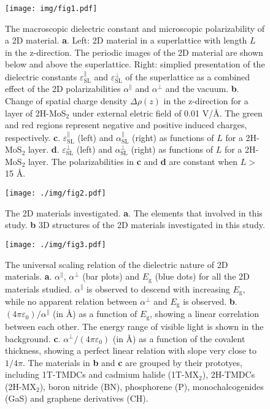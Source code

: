 \documentclass[journal=ancac3,manuscript=article,email=true,hyperref=true,keywords=false]{achemso}
\begin{document}
\label{sec:org34cbe74}
\begin{figure}[htbp]
\centering
\texttt{[image: img/fig1.pdf]}
\caption{\label{fig-1} The macroscopic dielectric constant and
  microscopic polarizability of a 2D material. \textbf{a}. Left: 2D
  material in a superlattice with length $L$ in the z-direction. The
  periodic images of the 2D material are shown below and above the
  superlattice. Right: simplied presentation of the dielectric
  constants $\varepsilon_{\mathrm{SL}}^{\parallel}$ and
  $\varepsilon_{\mathrm{SL}}^{\perp}$ of the superlattice as a
  combined effect of the 2D polarizabilities $\alpha^{\parallel}$ and
  $\alpha^{\perp}$ and the vacuum. \textbf{b}. Change of spatial
  charge density $\Delta \rho(z)$ in the z-direction for a layer of
  2H-MoS$_{2}$ under external eletric field of 0.01 V/\AA{}. The green
  and red regions represent negative and positive induced charges,
  respectively. \textbf{c}. $\varepsilon^{\parallel}_{\mathrm{SL}}$
  (left) and $\alpha_{\mathrm{SL}}^{\parallel}$ (right) as functions
  of $L$ for a 2H-MoS$_{2}$
  layer. \textbf{d}. $\varepsilon^{\perp}_{\mathrm{SL}}$ (left) and
  $\alpha_{\mathrm{SL}}^{\perp}$ (right) as functions of $L$ for a
  2H-MoS$_{2}$ layer. The polarizabilities in \textbf{c} and
  \textbf{d} are constant when $L>$15 \AA{}.}
\end{figure}

\begin{figure}[htbp]
\centering
\texttt{[image: ./img/fig2.pdf]}
\caption{\label{fig-2} The 2D materials investigated. \textbf{a}. The
  elements that involved in this study. \textbf{b} 3D structures of
  the 2D materials investigated in this study.}
\end{figure}

\begin{figure}[htbp]
\centering
\texttt{[image: ./img/fig3.pdf]}
\caption{\label{fig-3} The universal scaling relation of the
  dielectric nature of 2D materials. \textbf{a}. $\alpha^{\parallel}$,
  $\alpha^{\perp}$ (bar plots) and $E_{\mathrm{g}}$ (blue dots) for
  all the 2D materials studied.  $\alpha^{\parallel}$ is observed to
  descend with increasing $E_{\mathrm{g}}$, while no apparent relation
  between $\alpha^{\perp}$ and $E_{\mathrm{g}}$ is
  observed. \textbf{b}. $(4\pi \varepsilon_{0})/\alpha^{\parallel}$
  (in \AA{}) as a function of $E_{\mathrm{g}}$, showing a linear
  correlation between each other. The energy range of visible light is
  shown in the
  background. \textbf{c}. $\alpha^{\perp}/(4\pi\varepsilon_{0})$ (in
  \AA{}) as a function of the covalent thickness, showing a perfect
  linear relation with slope very close to $1/4\pi$. The materials in
  \textbf{b} and \textbf{c} are grouped by their prototyes, including
  1T-TMDCs and cadmium halide (1T-MX$_{2}$), 2H-TMDCs (2H-MX$_{2}$),
  boron nitride (BN), phosphorene (P), monochalcogenides (GaS) and
  graphene derivatives (CH).}
\end{figure}
\end{document}
